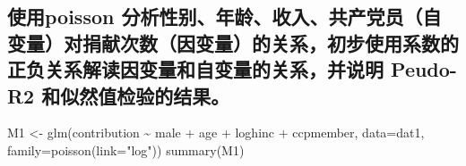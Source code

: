 \documentclass[
]{ctexart}
\newenvironment{Shaded}{\begin{snugshade}}{\end{snugshade}}
\newcommand{\AttributeTok}[1]{\textcolor[rgb]{0.77,0.63,0.00}{#1}}
\newcommand{\CommentTok}[1]{\textcolor[rgb]{0.56,0.35,0.01}{\textit{#1}}}
\newcommand{\DecValTok}[1]{\textcolor[rgb]{0.00,0.00,0.81}{#1}}
\newcommand{\FunctionTok}[1]{\textcolor[rgb]{0.00,0.00,0.00}{#1}}
\newcommand{\NormalTok}[1]{#1}
\newcommand{\OtherTok}[1]{\textcolor[rgb]{0.56,0.35,0.01}{#1}}
\newcommand{\SpecialCharTok}[1]{\textcolor[rgb]{0.00,0.00,0.00}{#1}}
\newcommand{\StringTok}[1]{\textcolor[rgb]{0.31,0.60,0.02}{#1}}
\begin{document}
\begin{Shaded}
\end{Shaded}

\hypertarget{ux4f7fux7528poisson-ux5206ux6790ux6027ux522bux5e74ux9f84ux6536ux5165ux5171ux4ea7ux515aux5458ux81eaux53d8ux91cfux5bf9ux6350ux732eux6b21ux6570ux56e0ux53d8ux91cfux7684ux5173ux7cfbux521dux6b65ux4f7fux7528ux7cfbux6570ux7684ux6b63ux8d1fux5173ux7cfbux89e3ux8bfbux56e0ux53d8ux91cfux548cux81eaux53d8ux91cfux7684ux5173ux7cfbux5e76ux8bf4ux660e-peudo-r2-ux548cux4f3cux7136ux503cux68c0ux9a8cux7684ux7ed3ux679c}{%
\subsection{使用poisson
分析性别、年龄、收入、共产党员（自变量）对捐献次数（因变量）的关系，初步使用系数的正负关系解读因变量和自变量的关系，并说明
Peudo-R2
和似然值检验的结果。}\label{ux4f7fux7528poisson-ux5206ux6790ux6027ux522bux5e74ux9f84ux6536ux5165ux5171ux4ea7ux515aux5458ux81eaux53d8ux91cfux5bf9ux6350ux732eux6b21ux6570ux56e0ux53d8ux91cfux7684ux5173ux7cfbux521dux6b65ux4f7fux7528ux7cfbux6570ux7684ux6b63ux8d1fux5173ux7cfbux89e3ux8bfbux56e0ux53d8ux91cfux548cux81eaux53d8ux91cfux7684ux5173ux7cfbux5e76ux8bf4ux660e-peudo-r2-ux548cux4f3cux7136ux503cux68c0ux9a8cux7684ux7ed3ux679c}}

\begin{Shaded}
\begin{Highlighting}[]
\NormalTok{M1 }\OtherTok{\textless{}{-}} \FunctionTok{glm}\NormalTok{(contribution }\SpecialCharTok{\textasciitilde{}}\NormalTok{ male }\SpecialCharTok{+}\NormalTok{ age }\SpecialCharTok{+}\NormalTok{ loghinc }\SpecialCharTok{+}\NormalTok{ ccpmember, }\AttributeTok{data=}\NormalTok{dat1, }\AttributeTok{family=}\FunctionTok{poisson}\NormalTok{(}\AttributeTok{link=}\StringTok{"log"}\NormalTok{))}
\FunctionTok{summary}\NormalTok{(M1)}
\end{Highlighting}
\end{Shaded}
\end{document}
